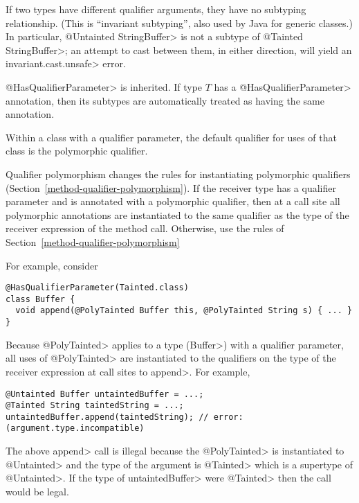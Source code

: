 If two types have different qualifier arguments, they have no subtyping
relationship.  (This is ``invariant subtyping'', also used by Java for
generic classes.)  In particular, \<@Untainted StringBuffer> is not a
subtype of \<@Tainted StringBuffer>; an attempt to cast between them, in
either direction, will yield an \<invariant.cast.unsafe> error.

\<@HasQualifierParameter> is inherited.  If type $T$ has a
\<@HasQualifierParameter> annotation, then its subtypes are automatically
treated as having the same annotation.


Within a class with a qualifier parameter,
the default qualifier for uses of that class is the polymorphic qualifier.



Qualifier polymorphism changes the rules for instantiating polymorphic
qualifiers (Section~\ref{method-qualifier-polymorphism}).
If the receiver type has a qualifier parameter and is annotated with a polymorphic qualifier,
then at a call site all polymorphic annotations are instantiated to
the same qualifier as the type of the receiver expression of the method call.
Otherwise, use the rules of Section~\ref{method-qualifier-polymorphism}

For example, consider

\begin{Verbatim}
@HasQualifierParameter(Tainted.class)
class Buffer {
  void append(@PolyTainted Buffer this, @PolyTainted String s) { ... }
}
\end{Verbatim}

\noindent
Because \<@PolyTainted> applies to a type (\<Buffer>) with a qualifier parameter, all
uses of \<@PolyTainted> are instantiated to the qualifiers on the type of
the receiver expression at call sites to \<append>. For example,

\begin{Verbatim}
@Untainted Buffer untaintedBuffer = ...;
@Tainted String taintedString = ...;
untaintedBuffer.append(taintedString); // error: (argument.type.incompatible)
\end{Verbatim}
The above \<append> call is illegal because the \<@PolyTainted> is instantiated to \<@Untainted> and
the type of the argument is \<@Tainted> which is a supertype of \<@Untainted>.  If the type of
\<untaintedBuffer> were \<@Tainted> then the call would be legal.


